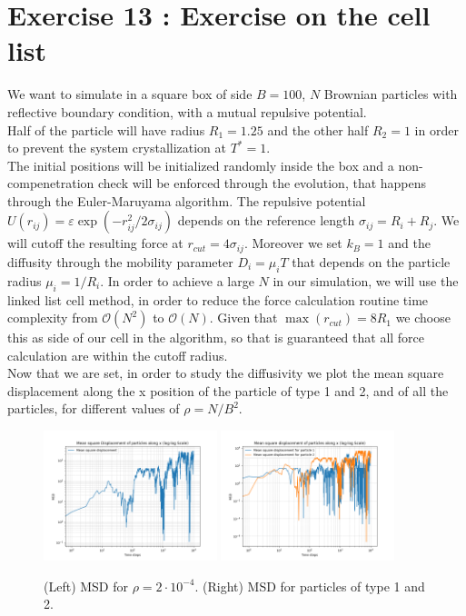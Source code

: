 \chapter*{Exercise 13 : Exercise on the cell list}
We want to simulate in a square box of side $B=100$, $N$ Brownian particles with reflective boundary condition, with a mutual repulsive potential. \\
Half of the particle will have radius $R_1 = 1.25$ and the other half $R_2 = 1$ in order to prevent the system crystallization at $T^*=1$. \\
The initial positions will be initialized randomly inside the box and a non-compenetration check will be enforced through the evolution, that happens through the Euler-Maruyama algorithm.
The repulsive potential $U(r_{ij}) = \varepsilon \exp(-r_{ij}^2 / 2 \sigma_{ij})$ depends on the reference length $\sigma_{ij} = R_i + R_j$. We will cutoff the resulting force at $r_{cut} = 4\sigma_{ij}$. Moreover we set $k_B = 1$ and the diffusity through the mobility parameter $D_i = \mu_i T $ that depends on the particle radius $\mu_i = 1/R_i$. 
In order to achieve a large $N$ in our simulation, we will use the linked list cell method, in order to reduce the force calculation routine time complexity from $\mathcal{O}(N^2)$ to $\mathcal{O}(N)$. Given that $\max(r_{cut}) = 8R_1$ we choose this as side of our cell in the algorithm, so that is guaranteed that all force calculation are within the cutoff radius. \\
Now that we are set, in order to study the diffusivity we plot the mean square displacement along the x position of the particle of type 1 and 2, and of all the particles, for different values of $\rho = N/B^2$. 

\begin{figure}[ht]
    \centering
    \includegraphics[width=0.45\textwidth]{FIG/ex13/MSD_particle_number2.png} 
    \hspace{0.05\textwidth}
    \includegraphics[width=0.45\textwidth]{FIG/ex13/MSD_particle_number2_particle1.png}
    \caption{(Left) MSD for $\rho = 2\cdot 10^{-4}$. (Right) MSD for particles of type 1 and 2.}
    \label{fig:combined2}
\end{figure}

